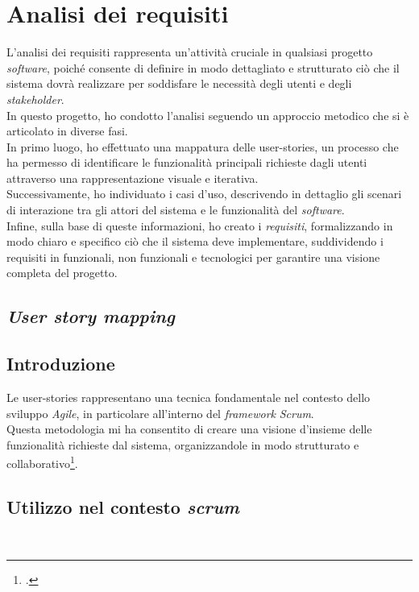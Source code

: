 \pagebreak
\section{Analisi dei requisiti}
\label{sez:analisi-dei-requisiti}
L’analisi dei requisiti rappresenta un'attività cruciale in qualsiasi progetto \textit{software}, poiché consente di definire in modo dettagliato e strutturato ciò che il sistema dovrà realizzare per soddisfare le necessità degli utenti e degli \textit{stakeholder}.\\
In questo progetto, ho condotto l’analisi seguendo un approccio metodico che si è articolato in diverse fasi.\\

\noindent In primo luogo, ho effettuato una mappatura delle \gls{user-stories}, un processo che ha permesso di identificare le funzionalità principali richieste dagli utenti attraverso una rappresentazione visuale e iterativa. \\
Successivamente, ho individuato i casi d’uso, descrivendo in dettaglio gli scenari di interazione tra gli attori del sistema e le funzionalità del \textit{software}.\\
Infine, sulla base di queste informazioni, ho creato i \textit{requisiti}, formalizzando in modo chiaro e specifico ciò che il sistema deve implementare, suddividendo i requisiti in funzionali, non funzionali e tecnologici per garantire una visione completa del progetto.
\subsection{\textit{User story mapping}}
\label{subsec:user-story-mapping}

\subsection*{Introduzione}
\label{subsubsec:introduzione}

Le \gls{user-stories} rappresentano una tecnica fondamentale nel contesto dello sviluppo \textit{Agile}, in particolare all'interno del \textit{framework} \textit{Scrum}. \\
Questa metodologia mi ha consentito di creare una visione d'insieme delle funzionalità richieste dal sistema, organizzandole in modo strutturato e collaborativo\footcite{site:user-stories}. \\

\subsection*{Utilizzo nel contesto \textit{scrum}}\\


